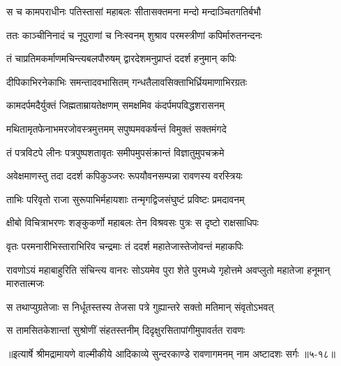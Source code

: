 \twolineshloka
{स च कामपराधीनः पतिस्तासां महाबलः}
{सीतासक्तमना मन्दो मन्दाञ्चितगतिर्बभौ} %

\twolineshloka
{ततः काञ्चीनिनादं च नूपुराणां च निःस्वनम्}
{शुश्राव परमस्त्रीणां कपिर्मारुतनन्दनः} %

\twolineshloka
{तं चाप्रतिमकर्माणमचिन्त्यबलपौरुषम्}
{द्वारदेशमनुप्राप्तं ददर्श हनुमान् कपिः} %

\twolineshloka
{दीपिकाभिरनेकाभिः समन्तादवभासितम्}
{गन्धतैलावसिक्ताभिर्ध्रियमाणाभिरग्रतः} %

\twolineshloka
{कामदर्पमदैर्युक्तं जिह्मताम्रायतेक्षणम्}
{समक्षमिव कंदर्पमपविद्धशरासनम्} %

\twolineshloka
{मथितामृतफेनाभमरजोवस्त्रमुत्तमम्}
{सपुष्पमवकर्षन्तं विमुक्तं सक्तमंगदे} %

\twolineshloka
{तं पत्रविटपे लीनः पत्रपुष्पशतावृतः}
{समीपमुपसंक्रान्तं विज्ञातुमुपचक्रमे} %

\twolineshloka
{अवेक्षमाणस्तु तदा ददर्श कपिकुञ्जरः}
{रूपयौवनसम्पन्ना रावणस्य वरस्त्रियः} %

\twolineshloka
{ताभिः परिवृतो राजा सुरूपाभिर्महायशाः}
{तन्मृगद्विजसंघुष्टं प्रविष्टः प्रमदावनम्} %

\twolineshloka
{क्षीबो विचित्राभरणः शङ्कुकर्णो महाबलः}
{तेन विश्रवसः पुत्रः स दृष्टो राक्षसाधिपः} %

\twolineshloka
{वृतः परमनारीभिस्ताराभिरिव चन्द्रमाः}
{तं ददर्श महातेजास्तेजोवन्तं महाकपिः} %

\threelineshloka
{रावणोऽयं महाबाहुरिति संचिन्त्य वानरः}
{सोऽयमेव पुरा शेते पुरमध्ये गृहोत्तमे}
{अवप्लुतो महातेजा हनूमान् मारुतात्मजः} %

\twolineshloka
{स तथाप्युग्रतेजाः स निर्धूतस्तस्य तेजसा}
{पत्रे गुह्यान्तरे सक्तो मतिमान् संवृतोऽभवत्} %

\twolineshloka
{स तामसितकेशान्तां सुश्रोणीं संहतस्तनीम्}
{दिदृक्षुरसितापांगीमुपावर्तत रावणः} %


॥इत्यार्षे श्रीमद्रामायणे वाल्मीकीये आदिकाव्ये सुन्दरकाण्डे रावणागमनम् नाम अष्टादशः सर्गः ॥५-१८॥
